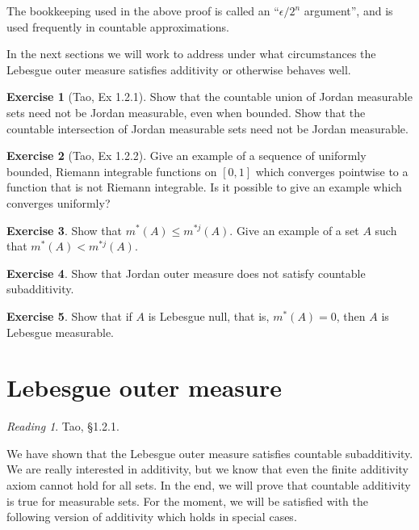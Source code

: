 \documentclass[11pt,oneside]{amsbook}
\theoremstyle{definition}
\newtheorem{exerc}{Exercise}[section]
\theoremstyle{plain}
\theoremstyle{definition}
\theoremstyle{remark}
\newtheorem*{reading}{Reading}
\numberwithin{equation}{section}
\numberwithin{figure}{section}
\begin{document}
The bookkeeping used in the above proof is called an ``$\epsilon/2^n$ argument'', and is used frequently in countable approximations.

In the next sections we will work to address under what circumstances the Lebesgue outer measure satisfies additivity or otherwise behaves well.

\begin{exerc}[Tao, Ex 1.2.1]
  Show that the countable union of Jordan measurable sets need not be Jordan measurable, even when bounded. Show that the countable intersection of Jordan measurable sets need not be Jordan measurable.
\end{exerc}

\begin{exerc}[Tao, Ex 1.2.2]
  Give an example of a sequence of uniformly bounded, Riemann integrable functions on $[0,1]$ which converges pointwise to a function that is not Riemann integrable. Is it possible to give an example which converges uniformly?
\end{exerc}

\begin{exerc}
  Show that $m^*(A)\leq m^{*j}(A)$. Give an example of a set $A$ such that $m^*(A)<m^{*j}(A)$.
\end{exerc}

\begin{exerc}
  Show that Jordan outer measure does not satisfy countable subadditivity.
\end{exerc}

\begin{exerc}
  Show that if $A$ is Lebesgue null, that is, $m^*(A)=0$, then $A$ is Lebesgue measurable.
\end{exerc}


\newpage
\section{Lebesgue outer measure}

\begin{reading}
  Tao, \S 1.2.1.
\end{reading}

We have shown that the Lebesgue outer measure satisfies countable subadditivity. We are really interested in additivity, but we know that even the finite additivity axiom cannot hold for all sets. In the end, we will prove that countable additivity is true for measurable sets. For the moment, we will be satisfied with the following version of additivity which holds in special cases.
\end{document}
